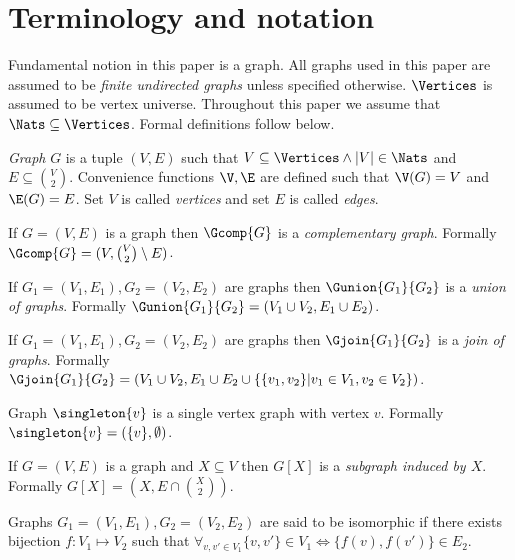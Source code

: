 
\section{Terminology and notation}

Fundamental notion in this paper is a graph. All graphs used in this paper are assumed to be \emph{finite undirected graphs} unless specified otherwise. $\Vertices$ is assumed to be vertex universe. Throughout this paper we assume that $\Nats \subseteq \Vertices$. Formal definitions follow below.

\begin{defi}
    \emph{Graph} $G$ is a tuple $(V,E)$ such that $V \subseteq \Vertices \land |V| \in \Nats$ and $E \subseteq \binom{V}{2}$. Convenience functions $\V, \E$ are defined such that $\V(G) = V$ and $\E(G) = E$. Set $V$ is called \emph{vertices} and set $E$ is called \emph{edges}.
\end{defi}

\begin{defi}
    If $G = (V, E)$ is a graph then $\Gcomp{G}$ is a \emph{complementary graph}. Formally $\Gcomp{G} = (V, \binom{V}{2} \setminus E)$.
\end{defi}
\begin{defi}
    If $G_1 = (V_1, E_1), G_2 = (V_2, E_2)$ are graphs then $\Gunion{G_1}{G_2}$ is a \emph{union of graphs}. Formally $\Gunion{G_1}{G_2} = (V_1 \cup V_2, E_1 \cup E_2)$.
\end{defi}
\begin{defi}
    If $G_1 = (V_1, E_1), G_2 = (V_2, E_2)$ are graphs then $\Gjoin{G_1}{G_2}$ is a \emph{join of graphs}. Formally $\Gjoin{G_1}{G_2} = (V_1 \cup V_2, E_1 \cup E_2 \cup \{\{v_1,v_2\}|v_1 \in V_1, v_2 \in V_2\})$.
\end{defi}

\begin{defi}
    Graph $\singleton{v}$ is a single vertex graph with vertex $v$. Formally $\singleton{v} = (\{v\}, \emptyset)$.
\end{defi}

\begin{defi}
    If $G = (V,E)$ is a graph and $X \subseteq V$ then $G[X]$ is a \emph{subgraph induced by $X$}. Formally $G[X] = (X, E \cap \binom{X}{2})$.
\end{defi}

\begin{defi}
    Graphs $G_1 = (V_1, E_1), G_2 = (V_2, E_2)$ are said to be isomorphic if there exists bijection $f: V_1 \mapsto V_2$ such that $\forall_{v, v' \in V_1} \{v,v'\} \in V_1 \iff \{f(v), f(v')\} \in E_2$.
\end{defi}

